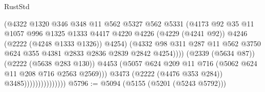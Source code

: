 \begin{lexlean}{RustStd}
\begin{coremodule}
                                        (@4322
                                          @1320
                                          @346
                                          @348
                                          @11
                                          @562
                                          @5327
                                          @562
                                          @5331
                                          (@4173
                                            @92
                                            @35
                                            @11
                                            @1057
                                            @996
                                            @1325
                                            @1333
                                            @4417
                                            @4220
                                            @4226
                                            (@4229 (@4241 @92))
                                            @4246
                                            (@2222 (@4248 @1333 @1326))
                                            @4254)
                                          (@4332
                                            @98
                                            @311
                                            @287
                                            @11
                                            @562
                                            @3750
                                            @624
                                            @355
                                            @4381
                                            @2833
                                            @2836
                                            @2839
                                            @2842
                                            @4254))))
                                    (@2339 (@5634 @87))
                                    (@2222 (@5638 @283 @130))
                                    @4453
                                    (@5057
                                      @624
                                      @209
                                      @11
                                      @716
                                      (@5062 @624 @11 @208 @716 @2563 @2569)))
                                  @3473
                                  (@2222 (@4476 @353 @284))
                                  @3485)))))))))))))))
@5796 := @5094 (@5155 (@5201 (@5243 @5792)))

\end{coremodule}
\end{lexlean}
